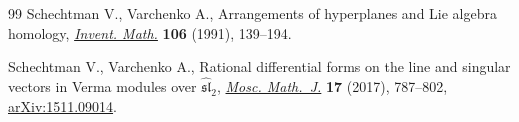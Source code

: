 \documentclass[pdftex]{sigma}
\numberwithin{equation}{section}
\begin{document}
\begin{thebibliography}{99}
Schechtman V., Varchenko A., Arrangements of hyperplanes and {L}ie algebra
 homology, \href{https://doi.org/10.1007/BF01243909}{\textit{Invent. Math.}} \textbf{106} (1991), 139--194.

Schechtman V., Varchenko A., Rational differential forms on the line and
 singular vectors in {V}erma modules over {$\widehat {\mathfrak{sl}}_2$},
 \href{https://doi.org/10.17323/1609-4514-2016-16-4-787-802}{\textit{Mosc. Math.~J.}} \textbf{17} (2017), 787--802, \href{https://arxiv.org/abs/1511.09014}{arXiv:1511.09014}.

\end{thebibliography}\LastPageEnding
\end{document}

